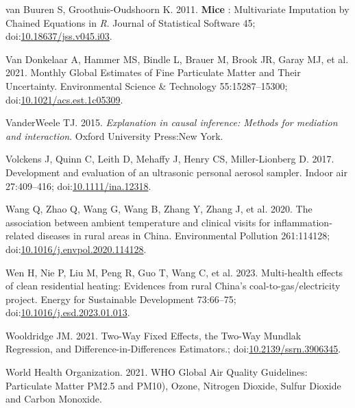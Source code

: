 \documentclass[
  letterpaper,
  DIV=11,
  numbers=noendperiod]{scrartcl}
\newlength{\cslhangindent}
\newlength{\cslentryspacingunit} %
\newenvironment{CSLReferences}[2] %
 {%
  \setlength{\parindent}{0pt}
  \ifodd #1
  \let\oldpar\par
  \def\par{\hangindent=\cslhangindent\oldpar}
  \fi
  \setlength{\parskip}{#2\cslentryspacingunit}
 }%
 {}
\begin{document}
\begin{CSLReferences}{1}{0}
\leavevmode{}%
van Buuren S, Groothuis-Oudshoorn K. 2011. {\textbf{Mice}} :
{Multivariate Imputation} by {Chained Equations} in {\emph{R}}. Journal
of Statistical Software 45;
doi:\href{https://doi.org/10.18637/jss.v045.i03}{10.18637/jss.v045.i03}.

\leavevmode{}%
Van Donkelaar A, Hammer MS, Bindle L, Brauer M, Brook JR, Garay MJ, et
al. 2021. Monthly {Global Estimates} of {Fine Particulate Matter} and
{Their Uncertainty}. Environmental Science \& Technology
55:15287--15300;
doi:\href{https://doi.org/10.1021/acs.est.1c05309}{10.1021/acs.est.1c05309}.

\leavevmode{}%
VanderWeele TJ. 2015. \emph{Explanation in causal inference: Methods for
mediation and interaction}. Oxford University Press:New York.

\leavevmode{}%
Volckens J, Quinn C, Leith D, Mehaffy J, Henry CS, Miller-Lionberg D.
2017. Development and evaluation of an ultrasonic personal aerosol
sampler. Indoor air 27:409--416;
doi:\href{https://doi.org/10.1111/ina.12318}{10.1111/ina.12318}.

\leavevmode{}%
Wang Q, Zhao Q, Wang G, Wang B, Zhang Y, Zhang J, et al. 2020. The
association between ambient temperature and clinical visits for
inflammation-related diseases in rural areas in {China}. Environmental
Pollution 261:114128;
doi:\href{https://doi.org/10.1016/j.envpol.2020.114128}{10.1016/j.envpol.2020.114128}.

\leavevmode{}%
Wen H, Nie P, Liu M, Peng R, Guo T, Wang C, et al. 2023. Multi-health
effects of clean residential heating: {Evidences} from rural {China}'s
coal-to-gas/electricity project. Energy for Sustainable Development
73:66--75;
doi:\href{https://doi.org/10.1016/j.esd.2023.01.013}{10.1016/j.esd.2023.01.013}.

\leavevmode{}%
Wooldridge JM. 2021. Two-{Way Fixed Effects}, the {Two-Way Mundlak
Regression}, and {Difference-in-Differences Estimators}.;
doi:\href{https://doi.org/10.2139/ssrn.3906345}{10.2139/ssrn.3906345}.

\leavevmode{}%
World Health Organization. 2021. {WHO Global Air Quality Guidelines}:
{Particulate Matter PM2}.5 and {PM10}), {Ozone}, {Nitrogen Dioxide},
{Sulfur Dioxide} and {Carbon Monoxide}.


\end{CSLReferences}
\end{document}
